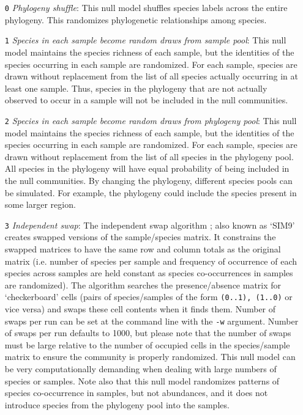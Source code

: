\documentclass[12pt,letterpaper]{article}
\begin{document}
\begin{itemize}
\item[\texttt{0}] \textit{Phylogeny shuffle}:
  This null model shuffles species labels across the entire
  phylogeny. This randomizes phylogenetic relationships among species.
\item[\texttt{1}] \textit{Species in each sample become random draws from
  sample pool}: This null model maintains the species richness of each
  sample, but the identities of the species occurring in each sample
  are randomized. For each sample, species are drawn without
  replacement from the list of all species actually occurring in at
  least one sample. Thus, species in the phylogeny that are not
  actually observed to occur in a sample will not be included in the
  null communities.
\item[\texttt{2}] \textit{Species in each sample become random draws from
  phylogeny pool}: This null model maintains the species richness of
  each sample, but the identities of the species occurring in each
  sample are randomized. For each sample, species are drawn without
  replacement from the list of all species in the phylogeny pool. All
  species in the phylogeny will have equal probability of being
  included in the null communities. By changing the phylogeny, different
  species pools can be simulated. For example, the phylogeny could include
  the species present in some larger region.
\item[\texttt{3}] \textit{Independent swap}: The independent swap
  algorithm \citep{gotelli2003swa}; also known as `SIM9'
  \citep{gotelli2000nul} creates swapped versions of the
  sample/species matrix. It constrains the swapped matrices to have
  the same row and column totals as the original matrix (i.e. number
  of species per sample and frequency of occurrence of each species
  across samples are held constant as species co-occurrences in
  samples are randomized). The algorithm searches the presence/absence
  matrix for `checkerboard' cells (pairs of species/samples of the
  form \verb|(0..1), (1..0)| or vice versa) and swaps these cell
  contents when it finds them. Number of swaps per run can be set at
  the command line with the \verb|-w| argument. Number of swaps per
  run defaults to 1000, but please note that the number of swaps must
  be large relative to the number of occupied cells in the
  species/sample matrix to ensure the community is properly
  randomized. This null model can be very computationally demanding
  when dealing with large numbers of species or samples. Note also
  that this null model randomizes patterns of species co-occurrence in
  samples, but not abundances, and it does not introduce species from
  the phylogeny pool into the samples.
\end{itemize}
\end{document}
